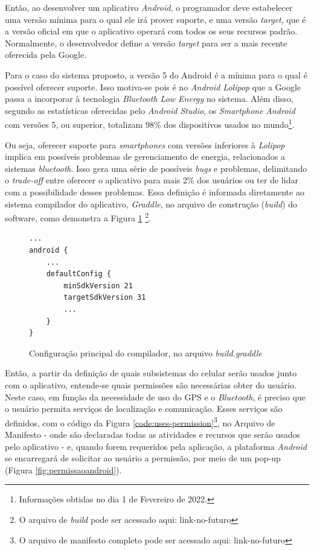 Então, ao desenvolver um aplicativo \textit{Android}, o programador deve estabelecer uma versão mínima para o qual ele irá prover suporte, e uma versão \textit{target}, que é a versão oficial em que o aplicativo operará com todos os seus recursos padrão. Normalmente, o desenvolvedor define a versão \textit{target} para ser a mais recente oferecida pela Google.

Para o caso do sistema proposto, a versão 5 do Android é a mínima para o qual é possível oferecer suporte. Isso motiva-se pois é no \textit{Android Lolipop} que a Google passa a incorporar à tecnologia \textit{Bluetooth Low Energy} no sistema. Além disso, segundo as estatísticas oferecidas pelo \textit{Android Studio}, os \textit{Smartphone} \textit{Android} com versões 5, ou superior, totalizam 98\% dos dispositivos usados no mundo\footnote{Informações obtidas no dia 1 de Fevereiro de 2022.}. 

Ou seja, oferecer suporte para \textit{smartphones} com versões inferiores à \textit{Lolipop} implica em possíveis problemas de gerenciamento de energia, relacionados a sistemas \textit{bluetooth}. Isso gera uma série de possíveis \textit{bugs} e problemas, delimitando o \textit{trade-off} entre oferecer o aplicativo para mais 2\% dos usuários ou ter de lidar com a possibilidade desses problemas. Essa definição é informada diretamente ao sistema compilador do aplicativo, \textit{Graddle}, no arquivo de construção (\textit{build}) do software, como demonstra a Figura \ref{code:compilation}  \footnote{O arquivo de \textit{build} pode ser acessado aqui: link-no-futuro}.

\begin{figure}[htb]
	\centering
	\caption{Configuração principal do compilador, no arquivo \textit{build.graddle}}
	\vspace{-15pt}
	\begin{verbatim}
...
android {
	...
	defaultConfig {
		minSdkVersion 21
		targetSdkVersion 31
		...
	}
}
\end{verbatim}
\label{code:compilation}
\vspace{-30pt}
\end{figure}

Então, a partir da definição de quais subsistemas do celular serão usados junto com o aplicativo, entende-se quais permissões são necessárias obter do usuário. Neste caso, em função da necessidade de uso do GPS e o \textit{Bluetooth}, é preciso que o usuário permita serviços de localização e comunicação. Esses serviços são definidos, com o código da Figura \ref{code:uses-permission}\footnote{O arquivo de manifesto completo pode ser acessado aqui: link-no-futuro}, no Arquivo de Manifesto - onde são declaradas todas as atividades e recursos que serão usados pelo aplicativo - e, quando forem requeridos pela aplicação, a plataforma \textit{Android} se encarregará de solicitar ao usuário a permissão, por meio de um pop-up (Figura \ref{fig:permissaoandroid}).

